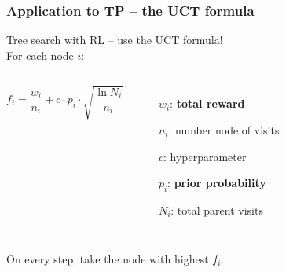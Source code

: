 \documentclass{beamer}
\begin{document}
\begin{frame}
    \frametitle{Application to TP -- the UCT formula}
    Tree search with RL -- use the UCT formula!\\
    For each node $i$:
    \begin{columns}
        \centering
    \begin{equation*}
        f_i=\frac{w_i}{n_i}+c\cdot p_i \cdot \sqrt{\frac{\ln N_i}{n_i}}
    \end{equation*}
    \begin{itemize}
        \small
        \item[$w_i$:] \textbf{total reward}
        \item[$n_i$:] number node of visits
        \item[$c$:] hyperparameter
        \item[$p_i$:] \textbf{prior probability}
        \item[$N_i$:] total parent visits
    \end{itemize}
    \end{columns}

    On every step, take the node with highest $f_i$.
\end{frame}
\end{document}
